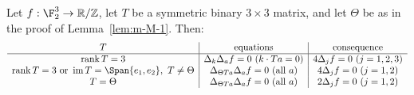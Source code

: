 Let $f:\F_2^3\to\mathbb R/\mathbb Z$, let $T$ be a symmetric binary $3\times3$ matrix, and let $\Theta$ be as in the proof of Lemma~\ref{lem:m-M-1}. Then:
\[
\begin{array}{c|c|c}
T&\text{equations}&\text{consequence}\\\hline
\operatorname{rank}T=3&\Delta_k\Delta_af=0\ (k\cdot Ta=0)&4\Delta_jf=0\ (j=1,2,3)\\
\operatorname{rank}T=3\text{ or }\operatorname{im}T=\Span\{e_1,e_2\},\ T\ne\Theta&\Delta_{\Theta Ta}\Delta_af=0\ (\text{all }a)&4\Delta_jf=0\ (j=1,2)\\
T=\Theta&\Delta_{\Theta Ta}\Delta_af=0\ (\text{all }a)&2\Delta_jf=0\ (j=1,2)
\end{array}
\]
